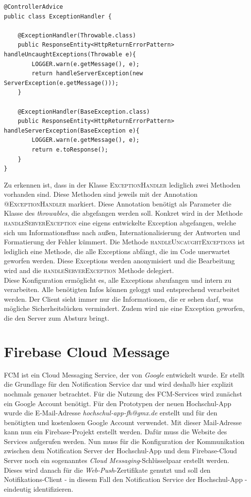 \newpage
\begin{lstlisting}[caption={Error Handling}]
@ControllerAdvice
public class ExceptionHandler {

    @ExceptionHandler(Throwable.class)
    public ResponseEntity<HttpReturnErrorPattern> handleUncaughtExceptions(Throwable e){
        LOGGER.warn(e.getMessage(), e);
        return handleServerException(new ServerException(e.getMessage()));
    }

    @ExceptionHandler(BaseException.class)
    public ResponseEntity<HttpReturnErrorPattern> handleServerException(BaseException e){
        LOGGER.warn(e.getMessage(), e);
        return e.toResponse();
    }
}
\end{lstlisting}

Zu erkennen ist, dass in der Klasse \textsc{ExceptionHandler} lediglich zwei Methoden vorhanden sind. Diese Methoden sind jeweils mit der Annotation \textsc{@ExceptionHandler} markiert. Diese Annotation benötigt als Parameter die Klasse des \textit{throwables}, die abgefangen werden soll. Konkret wird in der Methode \textsc{handleServerException} eine eigens entwickelte Exception abgefangen, welche sich um Informationsfluss nach außen, Internationalisierung der Antworten und Formatierung der Fehler kümmert. Die Methode \textsc{handleUncaughtExceptions} ist lediglich eine Methode, die alle Exceptions abfängt, die im Code unerwartet geworfen werden. Diese Exceptions werden anonymisiert und die Bearbeitung wird and die \textsc{handleServerException} Methode delegiert.\\
\linebreak
Diese Konfiguration ermöglicht es, alle Exceptions abzufangen und intern zu verarbeiten. Alle benötigten Infos können geloggt und entsprechend verarbeitet werden. Der Client sieht immer nur die Informationen, die er sehen darf, was mögliche Sicherheitslücken vermindert. Zudem wird nie eine Exception geworfen, die den Server zum Absturz bringt.

\section{Firebase Cloud Message}
\label{sec:notifications}

\ac{FCM} ist ein Cloud Messaging Service, der von \textit{Google} entwickelt wurde. Er stellt die Grundlage für den Notification Service dar und wird deshalb hier explizit nochmals genauer betrachtet. Für die Nutzung des \ac{FCM}-Services wird zunächst ein Google Account benötigt. Für den Prototypen der neuen Hochschul-\ac{App} wurde die E-Mail-Adresse \textit{hochschul-app-fh@gmx.de} erstellt und für den benötigten und kostenlosen Google Account verwendet. Mit dieser Mail-Adresse kann nun ein Firebase-Projekt erstellt werden. Dafür muss die Website des Services aufgerufen werden\autocite[][]{firebase_home}. Nun muss für die Konfiguration der Kommunikation zwischen dem Notification Server der Hochschul-\ac{App} und dem Firebase-Cloud Server noch ein sogenanntes \textit{Cloud Messaging}-Schlüsselpaar erstellt werden. Dieses wird danach für die \textit{Web-Push}-Zertifikate genutzt und soll den Notifikations-Client - in diesem Fall den Notification Service der Hochschul-\ac{App} - eindeutig identifizieren.

